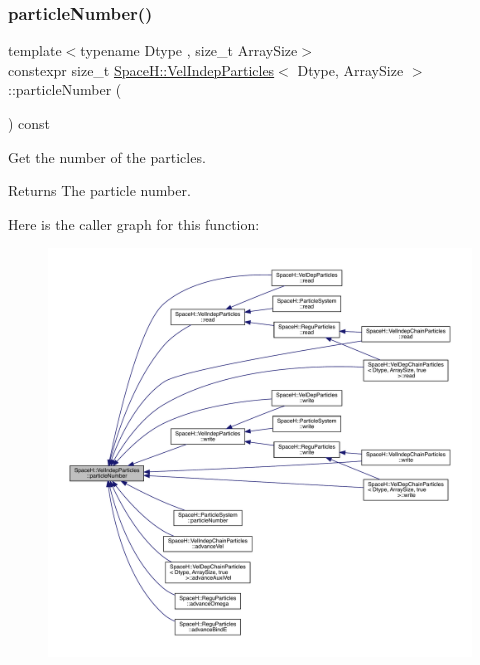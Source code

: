 \subsubsection{\texorpdfstring{particle\+Number()}{particleNumber()}}
{\footnotesize\ttfamily template$<$typename Dtype , size\+\_\+t Array\+Size$>$ \\
constexpr size\+\_\+t \mbox{\hyperlink{class_space_h_1_1_vel_indep_particles}{Space\+H\+::\+Vel\+Indep\+Particles}}$<$ Dtype, Array\+Size $>$\+::particle\+Number (\begin{DoxyParamCaption}{ }\end{DoxyParamCaption}) const\hspace{0.3cm}{\ttfamily [inline]}}



Get the number of the particles. 

\begin{DoxyReturn}{Returns}
The particle number. 
\end{DoxyReturn}
Here is the caller graph for this function\+:
\nopagebreak
\begin{figure}[H]
\begin{center}
\leavevmode
\includegraphics[width=350pt]{class_space_h_1_1_vel_indep_particles_a12c9a60ac96d922444e337b95749c806_icgraph}
\end{center}
\end{figure}
\mbox{\label{class_space_h_1_1_vel_indep_particles_a12ffb071816842a3d31eb11d49ab5b55}} 
